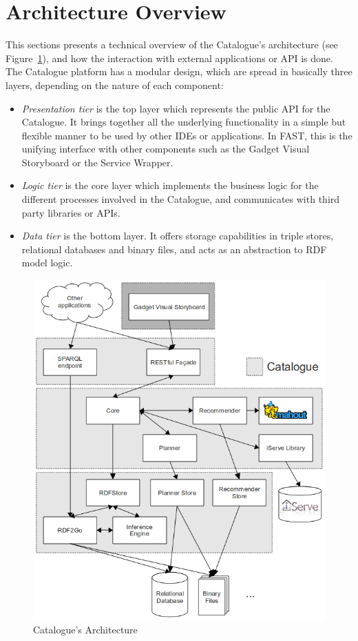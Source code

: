 \documentclass{fast_latex}
\begin{document}
\clearpage
\section{Architecture Overview} %
\label{sec:architecture_overview}

This sections presents a technical overview of the Catalogue's architecture (see Figure~\ref{fig:catalogue_architecture}), and how the interaction with external applications or API is done. The Catalogue platform has a modular design, which are spread in basically three layers, depending on the nature of each component:
\begin{itemize}
 \item \emph{Presentation tier} is the top layer which represents the public API for the Catalogue. It brings together all the underlying functionality in a simple but flexible manner to be used by other IDEs or applications. In FAST, this is the unifying interface with other components such as the Gadget Visual Storyboard or the Service Wrapper.
 \item \emph{Logic tier} is the core layer which implements the business logic for the different processes involved in the Catalogue, and communicates with third party libraries or APIs.
 \item \emph{Data tier} is the bottom layer. It offers storage capabilities in triple stores, relational databases and binary files, and acts as an abstraction to RDF model logic.
\end{itemize}

\begin{figure}[htb]
\label{fig:catalogue_architecture}
\begin{center}
	\includegraphics[width=13cm]{images/catalogue_architecture}
	\caption{Catalogue's Architecture}
\end{center}
\end{figure}
\end{document}
